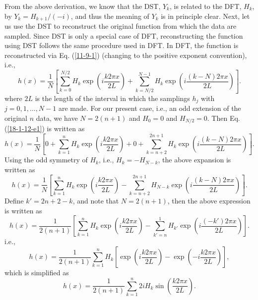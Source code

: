 \documentclass{article}
\begin{document}
From the above derivation, we know that the DST, $Y_k$, is related to the DFT,
$H_k$, by $Y_k = H_{k + 1} / (- i)$, and thus the meaning of $Y_k$ is in
principle clear. Next, let us use the DST to reconstruct the original function
from which the data are sampled. Since DST is only a special case of DFT,
reconstructing the function using DST follows the same procedure used in DFT.
In DFT, the function is reconstructed via Eq. (\ref{11-9-1}) (changing to the
positive exponent convention), i.e.,
\begin{equation}
  \label{18-1-12-e1} h (x) = \frac{1}{N} \left[ \sum_{k = 0}^{N / 2} H_k \exp
  \left( i \frac{k 2 \pi x}{2 L} \right) + \sum_{k = N / 2}^{N - 1} H_k \exp
  \left( i \frac{(k - N) 2 \pi x}{2 L} \right) \right] .
\end{equation}
where $2 L$ is the length of the interval in which the samplings $h_j$ with $j
= 0, 1, \ldots, N - 1$ are made. For our present case, i.e., an odd extension
of the original $n$ data, we have $N = 2 (n + 1)$ and $H_0 = 0$ and $H_{N / 2}
= 0$. Then Eq. (\ref{18-1-12-e1}) is written as
\begin{equation}
  h (x) = \frac{1}{N} \left[ 0 + \sum_{k = 1}^n H_k \exp \left( i \frac{k 2
  \pi x}{2 L} \right) + 0 + \sum_{k = n + 2}^{2 n + 1} H_k \exp \left( i
  \frac{(k - N) 2 \pi x}{2 L} \right) \right] .
\end{equation}
Using the odd symmetry of $H_k$, i.e., $H_k = - H_{N - k}$, the above
expansion is written as
\begin{equation}
  h (x) = \frac{1}{N} \left[ \sum_{k = 1}^n H_k \exp \left( i \frac{k 2 \pi
  x}{2 L} \right) - \sum_{k = n + 2}^{2 n + 1} H_{N - k} \exp \left( i
  \frac{(k - N) 2 \pi x}{2 L} \right) \right] .
\end{equation}
Define $k' = 2 n + 2 - k$, and note that $N = 2 (n + 1)$, then the above
expression is written as
\begin{equation}
  h (x) = \frac{1}{2 (n + 1)} \left[ \sum_{k = 1}^n H_k \exp \left( i \frac{k
  2 \pi x}{2 L} \right) - \sum_{k' = n}^1 H_{k'} \exp \left( i \frac{(- k') 2
  \pi x}{2 L} \right) \right] .
\end{equation}
i.e.,
\begin{equation}
  h (x) = \frac{1}{2 (n + 1)} \sum_{k = 1}^n H_k \left[ \exp \left( i \frac{k
  2 \pi x}{2 L} \right) - \exp \left( - i \frac{k 2 \pi x}{2 L} \right)
  \right],
\end{equation}
which is simplified as
\begin{equation}
  \label{18-1-12-e3} h (x) = \frac{1}{2 (n + 1)} \sum_{k = 1}^n 2 i H_k \sin
  \left( \frac{k 2 \pi x}{2 L} \right) .
\end{equation}
\end{document}
